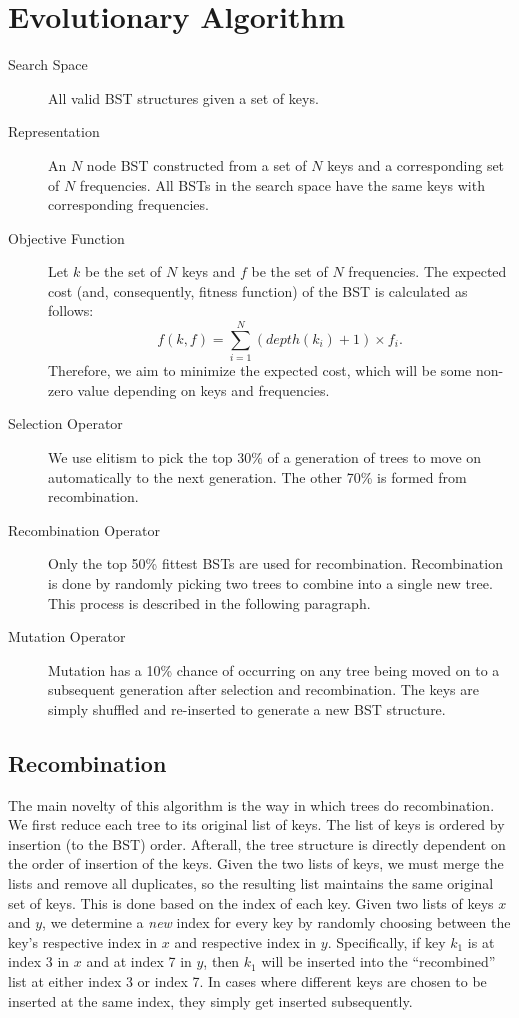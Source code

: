 
\section{Evolutionary Algorithm}
\label{sec-algorithm}

\begin{description}
    \item[Search Space] All valid BST structures given a set of keys.
    \item[Representation] An $N$ node BST constructed from a set of $N$ keys and a corresponding set of $N$ frequencies. All BSTs in the search space have the same keys with corresponding frequencies.
    \item[Objective Function] Let $k$ be the set of $N$ keys and $f$ be the set of $N$ frequencies. The expected cost (and, consequently, fitness function) of the BST is calculated as follows:
    \begin{equation*}
        f(k, f) = \sum_{i=1}^{N} (depth(k_i) + 1) \times f_i.
    \end{equation*}
    Therefore, we aim to minimize the expected cost, which will be some non-zero value depending on keys and frequencies.
    \item[Selection Operator] We use elitism to pick the top 30\% of a generation of trees to move on automatically to the next generation. The other 70\% is formed from recombination.
    \item[Recombination Operator] Only the top 50\% fittest BSTs are used for recombination. Recombination is done by randomly picking two trees to combine into a single new tree. This process is described in the following paragraph.
    \item[Mutation Operator] Mutation has a 10\% chance of occurring on any tree being moved on to a subsequent generation after selection and recombination. The keys are simply shuffled and re-inserted to generate a new BST structure.
\end{description}

\subsection{Recombination}
The main novelty of this algorithm is the way in which trees do recombination. We first reduce each tree to its original list of keys. The list of keys is ordered by insertion (to the BST) order. Afterall, the tree structure is directly dependent on the order of insertion of the keys. Given the two lists of keys, we must merge the lists and remove all duplicates, so the resulting list maintains the same original set of keys. This is done based on the index of each key. Given two lists of keys $x$ and $y$, we determine a \emph{new} index for every key by randomly choosing between the key's respective index in $x$ and respective index in $y$. Specifically, if key $k_1$ is at index 3 in $x$ and at index 7 in $y$, then $k_1$ will be inserted into the ``recombined'' list at either index 3 or index 7. In cases where different keys are chosen to be inserted at the same index, they simply get inserted subsequently.
